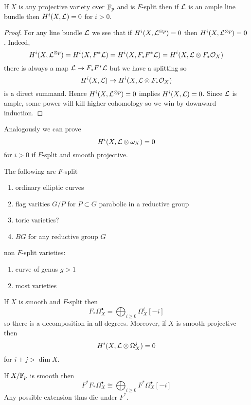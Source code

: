 \documentclass[12pt]{article}
\begin{document}
\begin{prop}
If $X$ is any projective variety over $\mathbb{F}_p$ and is $F$-split then if $\mathcal{L}$ is an ample line bundle then $H^i(X, \mathcal{L}) = 0$ for $i > 0$. 
\end{prop}

\begin{proof}
For any line bundle $\mathcal{L}$ we see that if $H^i(X, \mathcal{L}^{\otimes p}) = 0$ then $H^i(X, \mathcal{L}^{\otimes p}) = 0$. Indeed,
\[ H^i(X, \mathcal{L}^{\otimes p}) = H^i(X, F^* \mathcal{L}) = H^i(X, F_* F^* \mathcal{L}) = H^i(X, \mathcal{L} \otimes F_* \mathcal{O}_{X}) \]
there is always a map $\mathcal{L} \to F_* F^* \mathcal{L}$ but we have a splitting so 
\[ H^i(X, \mathcal{L}) \to H^i(X, \mathcal{L} \otimes F_* \mathcal{O}_{X}) \]
is a direct summand. Hence $H^i(X, \mathcal{L}^{\otimes p}) = 0$ implies $H^i(X, \mathcal{L}) = 0$. Since $\mathcal{L}$ is ample, some power will kill higher cohomology so we win by downward induction. 
\end{proof}

Analogously we can prove
\[ H^i(X, \mathcal{L} \otimes \omega_X) = 0 \]
for $i > 0$ if $F$-split and smooth projective.

\begin{example}
The following are $F$-split
\begin{enumerate}
\item ordinary elliptic curves
\item flag varities $G / P$ for $P \subset G$ parabolic in a reductive group
\item toric varieties?
\item $B G$ for any reductive group $G$ 
\end{enumerate}
non $F$-split varieties: 
\begin{enumerate}
\item curve of genus $g > 1$
\item most varieties
\end{enumerate}
\end{example}

\begin{theorem}[P]
If $X$ is smooth and $F$-split then 
\[ F_* \Omega_X^\bullet = \bigoplus_{i \ge 0} \Omega_X^i[-i] \]
so there is a decomposition in all degrees. Moreover, if $X$ is smooth projective then \[ H^i(X, \mathcal{L} \otimes \Omega_X^j) = 0 \]
for $i + j > \dim{X}$. 
\end{theorem}

\begin{prop}
If $X / \mathbb{F}_p$ is smooth then
\[ F^* F_* \Omega_X^\bullet \cong \bigoplus_{i \ge 0} F^* \Omega_X^\bullet [-i] \]
Any possible extension thus die under $F^*$.
\end{prop}
\end{document}
